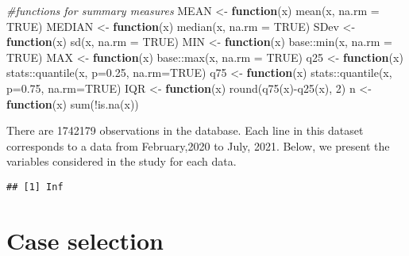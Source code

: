 \documentclass[
]{article}
\newenvironment{Shaded}{\begin{snugshade}}{\end{snugshade}}
\newcommand{\AttributeTok}[1]{\textcolor[rgb]{0.77,0.63,0.00}{#1}}
\newcommand{\CommentTok}[1]{\textcolor[rgb]{0.56,0.35,0.01}{\textit{#1}}}
\newcommand{\ConstantTok}[1]{\textcolor[rgb]{0.00,0.00,0.00}{#1}}
\newcommand{\ControlFlowTok}[1]{\textcolor[rgb]{0.13,0.29,0.53}{\textbf{#1}}}
\newcommand{\DecValTok}[1]{\textcolor[rgb]{0.00,0.00,0.81}{#1}}
\newcommand{\FloatTok}[1]{\textcolor[rgb]{0.00,0.00,0.81}{#1}}
\newcommand{\FunctionTok}[1]{\textcolor[rgb]{0.00,0.00,0.00}{#1}}
\newcommand{\NormalTok}[1]{#1}
\newcommand{\OtherTok}[1]{\textcolor[rgb]{0.56,0.35,0.01}{#1}}
\newcommand{\SpecialCharTok}[1]{\textcolor[rgb]{0.00,0.00,0.00}{#1}}
\begin{document}
\begin{Shaded}
\begin{Highlighting}[]
\CommentTok{\#functions for summary measures}
\NormalTok{MEAN }\OtherTok{\textless{}{-}} \ControlFlowTok{function}\NormalTok{(x) }\FunctionTok{mean}\NormalTok{(x, }\AttributeTok{na.rm =} \ConstantTok{TRUE}\NormalTok{)}
\NormalTok{MEDIAN }\OtherTok{\textless{}{-}} \ControlFlowTok{function}\NormalTok{(x) }\FunctionTok{median}\NormalTok{(x, }\AttributeTok{na.rm =} \ConstantTok{TRUE}\NormalTok{)}
\NormalTok{SDev }\OtherTok{\textless{}{-}} \ControlFlowTok{function}\NormalTok{(x) }\FunctionTok{sd}\NormalTok{(x, }\AttributeTok{na.rm =} \ConstantTok{TRUE}\NormalTok{)}
\NormalTok{MIN }\OtherTok{\textless{}{-}} \ControlFlowTok{function}\NormalTok{(x) base}\SpecialCharTok{::}\FunctionTok{min}\NormalTok{(x, }\AttributeTok{na.rm =} \ConstantTok{TRUE}\NormalTok{)}
\NormalTok{MAX }\OtherTok{\textless{}{-}} \ControlFlowTok{function}\NormalTok{(x) base}\SpecialCharTok{::}\FunctionTok{max}\NormalTok{(x, }\AttributeTok{na.rm =} \ConstantTok{TRUE}\NormalTok{)}
\NormalTok{q25 }\OtherTok{\textless{}{-}} \ControlFlowTok{function}\NormalTok{(x) stats}\SpecialCharTok{::}\FunctionTok{quantile}\NormalTok{(x, }\AttributeTok{p=}\FloatTok{0.25}\NormalTok{, }\AttributeTok{na.rm=}\ConstantTok{TRUE}\NormalTok{)}
\NormalTok{q75 }\OtherTok{\textless{}{-}} \ControlFlowTok{function}\NormalTok{(x) stats}\SpecialCharTok{::}\FunctionTok{quantile}\NormalTok{(x, }\AttributeTok{p=}\FloatTok{0.75}\NormalTok{, }\AttributeTok{na.rm=}\ConstantTok{TRUE}\NormalTok{)}
\NormalTok{IQR }\OtherTok{\textless{}{-}} \ControlFlowTok{function}\NormalTok{(x) }\FunctionTok{round}\NormalTok{(}\FunctionTok{q75}\NormalTok{(x)}\SpecialCharTok{{-}}\FunctionTok{q25}\NormalTok{(x), }\DecValTok{2}\NormalTok{)}
\NormalTok{n }\OtherTok{\textless{}{-}} \ControlFlowTok{function}\NormalTok{(x)  }\FunctionTok{sum}\NormalTok{(}\SpecialCharTok{!}\FunctionTok{is.na}\NormalTok{(x))}
\end{Highlighting}
\end{Shaded}

There are 1742179 observations in the database. Each line in this
dataset corresponds to a data from February,2020 to July, 2021. Below,
we present the variables considered in the study for each data.

\begin{verbatim}
## [1] Inf
\end{verbatim}

\hypertarget{case-selection}{%
\section{Case selection}\label{case-selection}}
\end{document}
